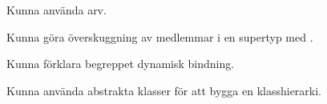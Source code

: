 
\item Kunna använda arv.
\item Kunna göra överskuggning av medlemmar i en supertyp med .
\item Kunna förklara begreppet dynamisk bindning.
\item Kunna använda abstrakta klasser för att bygga en klasshierarki.
